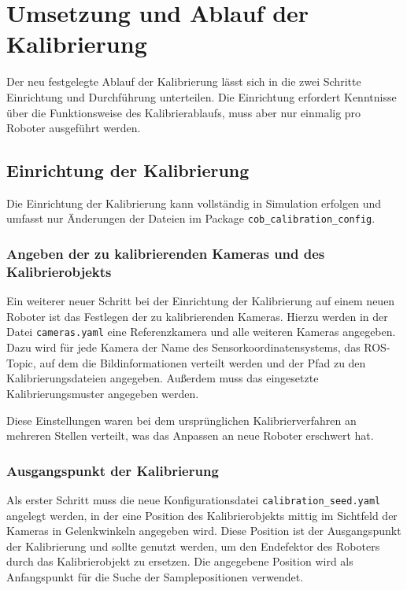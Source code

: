\chapter{Umsetzung und Ablauf der Kalibrierung}

Der neu festgelegte Ablauf der Kalibrierung lässt sich in die zwei Schritte 
Einrichtung und Durchführung unterteilen. Die Einrichtung erfordert Kenntnisse
über die Funktionsweise des Kalibrierablaufs, muss aber nur einmalig pro Roboter
ausgeführt werden.

\section{Einrichtung der Kalibrierung}
\label{sec:Einrichtung der Kalibrierung}

Die Einrichtung der Kalibrierung kann vollständig in Simulation erfolgen und 
umfasst nur Änderungen der Dateien im Package \texttt{cob\_calibration\_config}. 


\subsection{Angeben der zu kalibrierenden Kameras und des Kalibrierobjekts}
\label{sub:Angeben der zu kalibrierenden Kameras}

Ein weiterer neuer Schritt bei der Einrichtung der Kalibrierung auf einem neuen
Roboter ist das Festlegen der zu kalibrierenden Kameras. Hierzu werden in der 
Datei \texttt{cameras.yaml} eine Referenzkamera und alle weiteren Kameras angegeben.
Dazu wird für jede Kamera der Name des Sensorkoordinatensystems, das
\ac{ROS}-Topic, auf dem die Bildinformationen verteilt werden und der Pfad zu den
Kalibrierungsdateien angegeben. Außerdem muss das eingesetzte Kalibrierungsmuster
angegeben werden. 

Diese Einstellungen waren bei dem ursprünglichen Kalibrierverfahren an mehreren 
Stellen verteilt, was das Anpassen an neue Roboter erschwert hat.
\subsection{Ausgangspunkt der Kalibrierung}
\label{sub:Ausgangspunkt der Kalibrierung}

Als
erster Schritt muss die neue Konfigurationsdatei \texttt{calibration\_seed.yaml} 
angelegt werden, in der eine Position des Kalibrierobjekts mittig im Sichtfeld
der Kameras in Gelenkwinkeln angegeben wird. Diese Position ist der Ausgangspunkt
der Kalibrierung und sollte genutzt werden, um den Endefektor des Roboters durch 
das Kalibrierobjekt zu ersetzen. Die angegebene Position wird als Anfangspunkt 
für die Suche der Samplepositionen verwendet.


